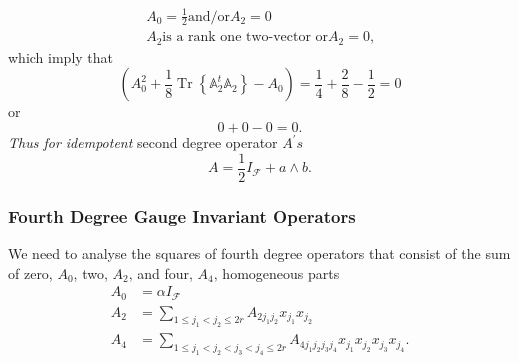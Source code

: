 \documentclass[aps, preprint]{revtex4}
\begin{document}
\begin{gather}A_{0} =\frac{1}{2}\text{and/or}A_{2} =0 \\
A_{2}\text{is a rank one two-vector or}A_{2} =0\text{,}\end{gather}which imply that
\begin{equation}\left (A_{0}^{2} +\frac{1}{8} \ensuremath{\operatorname*{Tr}}\left \{\mathbb{A}_{2}^{t} \mathbb{A}_{2}\right \} -A_{0}\right ) =\frac{1}{4} +\frac{2}{8} -\frac{1}{2} =0
\end{equation}or
\begin{equation}0 +0 -0 =0.
\end{equation}\emph{Thus for idempotent }second degree operator $A^{ \prime } s$
\begin{equation}A =\frac{1}{2} I_{\mathcal{F}} +a \wedge b\text{.}
\end{equation}

\subsubsection{Fourth Degree Gauge Invariant Operators}
We need to analyse the squares of fourth degree operators that consist of the sum of zero, $A_{0}$, two, $A_{2}\text{,}$ and four, $A_{4}\text{,}$ homogeneous parts
\begin{align}A_{0} &  =\alpha  I_{\mathcal{F}} \\
A_{2} &  =\sum _{1 \leq j_{1} <j_{2} \leq 2 r}A_{2 j_{1} j_{2}} x_{j_{1}} x_{j_{2}} \\
A_{4} &  =\sum _{1 \leq j_{1} <j_{2} <j_{3} <j_{4} \leq 2 r}A_{4 j_{1} j_{2} j_{3} j_{4}} x_{j_{1}} x_{j_{2}} x_{j_{3}} x_{j_{4}}\text{.}\end{align}
\end{document}
